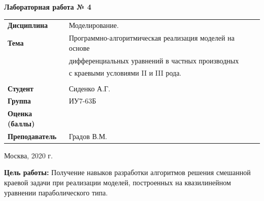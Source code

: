 \documentclass[a4paper,14pt]{extreport} %
\begin{document}
\begin{titlepage}
    \vspace{2cm}

    \begin{center}
        \textbf{Лабораторная работа № 4} \\
        \vspace{0.5cm}
    \end{center}

    \vspace{4cm}

    \begin{flushleft}
        \begin{tabular}{ll}
            \textbf{Дисциплина} & Моделирование.  \\
            \textbf{Тема} & Программно-алгоритмическая реализация моделей на основе \\
            & дифференциальных уравнений в частных производных \\
            & с краевыми условиями II и  III рода.\\
            \\
            \textbf{Студент} & Сиденко А.Г. \\
            \textbf{Группа} & ИУ7-63Б \\
            \textbf{Оценка (баллы)} & \\
            \textbf{Преподаватель} & Градов В.М.   \\
        \end{tabular}
    \end{flushleft}

    \vspace{4cm}

   \begin{center}
        Москва, 2020 г.
    \end{center}

\end{titlepage}

\textbf{Цель работы:} Получение навыков разработки  алгоритмов решения смешанной краевой задачи при реализации моделей, построенных на квазилинейном уравнении параболического типа. 
\end{document}
